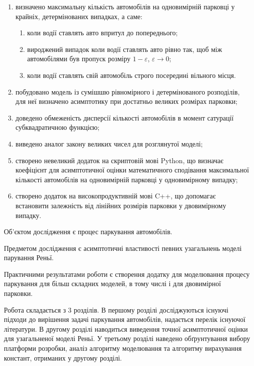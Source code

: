 \begin{enumerate}
	\item визначено максимальну кількість автомобілів на одновимірній парковці у крайніх, детермінованих випадках, а саме:
	\begin{enumerate}
		\item коли водії ставлять авто впритул до попереднього;
		\item вироджений випадок коли водії ставлять авто рівно так, щоб між автомобілями був пропуск розміру $1 - \varepsilon$, $\varepsilon \rightarrow 0$;
		\item коли водії ставлять свій автомобіль строго посередині вільного місця.
	\end{enumerate}
    \item побудовано модель із сумішшю рівномірного і детермінованого розподілів, для неї визначено асимптотику при достатньо великих розмірах парковки;
    \item доведено обмеженість дисперсії кількості автомобілів в момент сатурації субквадратичною функцією;
    \item виведено аналог закону великих чисел для розглянутої моделі;
	\item створено невеликий додаток на скриптовій мові Python, що визначає коефіцієнт для 	асимптотичної оцінки математичного сподівання максимальної кількості автомобілів на 	одновимірній парковці у одновимірному випадку;
    \item створено додаток на високопродуктивній мові C++, що допомагає встановити залежність від лінійних розмірів парковки у двовимірному випадку.
\end{enumerate}

Об'єктом дослідження є процес паркування автомобілів.

Предметом дослідження є асимптотичні властивості певних узагальнень моделі парування Реньї.

Практичними результатами роботи є створення додатку для моделювання процесу паркування для більш складних моделей, в тому числі і для двовимірної парковки.

Робота складається з 3 розділів. В першому розділі досліджуються існуючі підходи до вирішення задачі паркування автомобілів, надається перелік існуючої літератури. В другому розділі наводиться виведення точної асимптотичної оцінки для узагальненої моделі Реньї. У третьому розділі наведено обґрунтування вибору платформи розробки, аналіз алгоритму моделювання та алгоритму вирахування констант, отриманих у другому розділі.